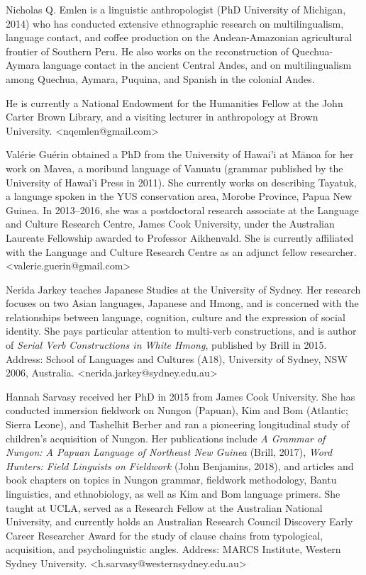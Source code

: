 \begin{refsection}
Nicholas Q. Emlen is a linguistic anthropologist (PhD University of Michigan, 2014) who has conducted extensive ethnographic research on multilingualism, language contact, and coffee production on the Andean-Amazonian agricultural frontier of Southern Peru. He also works on the reconstruction of Quechua-Aymara language contact in the ancient Central Andes, and on multilingualism among Quechua, Aymara, Puquina, and Spanish in the colonial Andes. 

\pagebreak
\noindent
He is currently a National Endowment for the Humanities Fellow at the John Carter Brown Library, and a visiting lecturer in anthropology at Brown University. <nqemlen@gmail.com>

Valérie Guérin obtained a PhD from the University of Hawai'i at Mānoa for her work on Mavea, a moribund language of Vanuatu (grammar published by the University of Hawai'i Press in 2011).  She currently works on describing Tayatuk, a language spoken in the YUS conservation area, Morobe Province, Papua New Guinea. In 2013--2016, she was a postdoctoral research associate at the Language and Culture Research Centre, James Cook University, under the Australian Laureate Fellowship awarded to Professor Aikhenvald. She is currently affiliated with the Language and Culture Research Centre as an adjunct fellow researcher. <valerie.guerin@gmail.com>

Nerida Jarkey teaches Japanese Studies at the University of Sydney. Her research focuses on two Asian languages, Japanese and Hmong, and is concerned with the relationships between language, cognition, culture and the expression of social identity. She pays particular attention to multi-verb constructions, and is author of \textit{Serial Verb Constructions in White Hmong}, published by Brill in 2015. Address: School of Languages and Cultures (A18), University of Sydney, NSW 2006, Australia. <nerida.jarkey@sydney.edu.au> 

Hannah Sarvasy received her PhD in 2015 from James Cook University. She has conducted immersion fieldwork on Nungon (Papuan), Kim and Bom (Atlantic; Sierra Leone), and Tashelhit Berber and ran a pioneering longitudinal study of children’s acquisition of Nungon. Her publications include \textit{A Grammar of Nungon: A Papuan Language of Northeast New Guinea} (Brill, 2017), \textit{Word Hunters: Field Linguists on Fieldwork} (John Benjamins, 2018), and articles and book chapters on topics in Nungon grammar, fieldwork methodology, Bantu linguistics, and ethnobiology, as well as Kim and Bom language primers. She taught at UCLA, served as a Research Fellow at the Australian National University, and currently holds an Australian Research Council Discovery Early Career Researcher Award for the study of clause chains from typological, acquisition, and psycholinguistic angles. Address: MARCS Institute, Western Sydney University. <h.sarvasy@westernsydney.edu.au>


\sloppy


\printbibliography[heading=subbibliography]
\end{refsection}